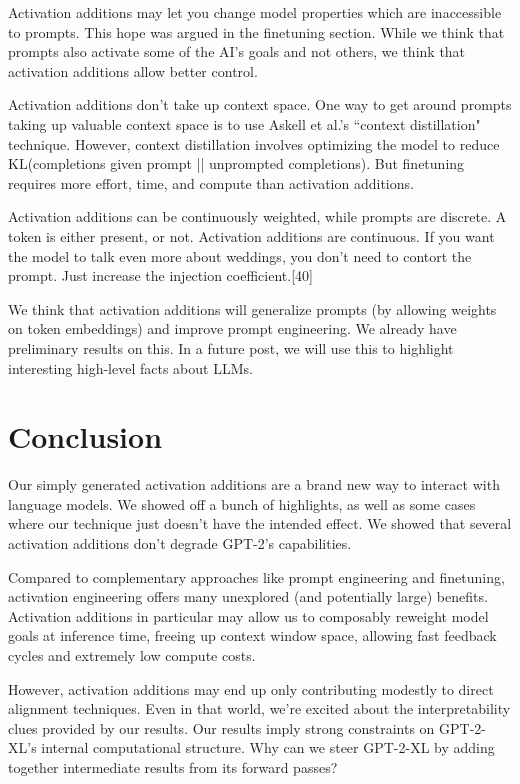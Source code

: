 \documentclass[10pt]{article}
\begin{document}
Activation additions may let you change model properties which are inaccessible to prompts. This hope was argued in the finetuning section. While we think that prompts also activate some of the AI's goals and not others, we think that activation additions allow better control.

Activation additions don't take up context space. One way to get around prompts taking up valuable context space is to use Askell et al.'s ``context distillation" technique. However, context distillation involves optimizing the model to reduce KL(completions given prompt || unprompted completions). But finetuning requires more effort, time, and compute than activation additions.  

Activation additions can be continuously weighted, while prompts are discrete. A token is either present, or not. Activation additions are continuous. If you want the model to talk even more about weddings, you don't need to contort the prompt. Just increase the injection coefficient.[40]

We think that activation additions will generalize prompts (by allowing weights on token embeddings) and improve prompt engineering. We already have preliminary results on this. In a future post, we will use this to highlight interesting high-level facts about LLMs.


\section{Conclusion}
Our simply generated activation additions are a brand new way to interact with language models. We showed off a bunch of highlights, as well as some cases where our technique just doesn't have the intended effect. We showed that several activation additions don't degrade GPT-2's capabilities. 

Compared to complementary approaches like prompt engineering and finetuning, activation engineering offers many unexplored (and potentially large) benefits. Activation additions in particular may allow us to composably reweight model goals at inference time, freeing up context window space, allowing fast feedback cycles and extremely low compute costs. 

However, activation additions may end up only contributing modestly to direct alignment techniques. Even in that world, we're excited about the interpretability clues provided by our results. Our results imply strong constraints on GPT-2-XL's internal computational structure. Why can we steer GPT-2-XL by adding together intermediate results from its forward passes?
\end{document}
